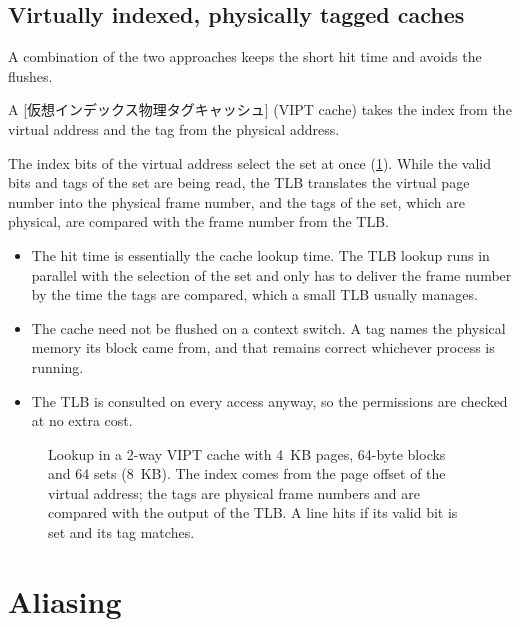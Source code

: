 \documentclass[../main.tex]{subfiles}
\begin{document}
\subsection{Virtually indexed, physically tagged caches}

A combination of the two approaches keeps the short hit time and avoids the
flushes.

\begin{definition}
  A [仮想インデックス物理タグキャッシュ]%
   (VIPT cache)
  takes the index from the virtual address and the tag from the physical
  address.
\end{definition}

The index bits of the virtual address select the set at once
(\cref{fig:l14-vipt}).  While the valid bits and tags of the set are being
read, the TLB translates the virtual page number into the physical frame
number, and the tags of the set, which are physical, are compared with the
frame number from the TLB.
\begin{itemize}
  \item The hit time is essentially the cache lookup time.  The TLB lookup
    runs in parallel with the selection of the set and only has to deliver
    the frame number by the time the tags are compared, which a small TLB
    usually manages.
  \item The cache need not be flushed on a context switch.  A tag names the
    physical memory its block came from, and that remains correct whichever
    process is running.
  \item The TLB is consulted on every access anyway, so the permissions are
    checked at no extra cost.
\end{itemize}

\begin{figure}[htbp]
  \centering
  
  \caption{Lookup in a 2-way VIPT cache with 4~KB pages, 64-byte blocks and
    64 sets (8~KB).  The index comes from the page offset of the virtual
    address; the tags are physical frame numbers and are compared with the
    output of the TLB.  A line hits if its valid bit is set and its tag
    matches.}
  \label{fig:l14-vipt}
\end{figure}

\section{Aliasing}
\label{sec:l14-aliasing}
\end{document}
